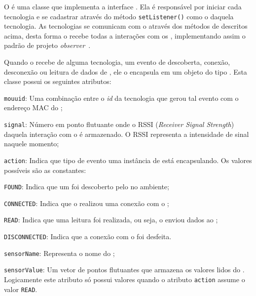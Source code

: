 O \stwopa é uma classe que implementa a interface \techlistener.
Ela é responsável por iniciar cada tecnologia e se cadastrar através do método \texttt{setListener()} como o \listener daquela tecnologia.
As tecnologias se comunicam com o \stwopa através dos métodos de \techlistener descritos acima, desta forma o \stwopa recebe todas a interações com os \smartobjs, implementando assim o padrão de projeto \textit{observer}~\cite{gamma:et-al:1994}.

Quando o \stwopa recebe de alguma tecnologia, um evento de descoberta, conexão, desconexão ou leitura de dados de \smartobjs, ele o encapsula em um objeto do tipo \sensordata.
Esta classe possui os seguintes atributos:

\begin{alineas}
	\item \texttt{mouuid}: Uma combinação entre o \textit{id} da tecnologia que gerou tal evento com o endereço MAC do \smartobj;

	\item \texttt{signal}: Número em ponto flutuante onde o RSSI (\textit{Receiver Signal Strength}) daquela interação com o \smartobj é armazenado. O RSSI representa a intensidade de sinal naquele momento;

	\item \texttt{action}: Indica que tipo de evento uma instância de \sensordata está encapsulando. Os valores possíveis são as constantes:

	\begin{alineas}

		\item \texttt{FOUND}: Indica que um \smartobj foi descoberto pelo \mhub no ambiente;

		\item \texttt{CONNECTED}: Indica que o \mhub realizou uma conexão com o \smartobj;

		\item \texttt{READ}: Indica que uma leitura foi realizada, ou seja, o \smartobj enviou dados ao \mhub;

		\item \texttt{DISCONNECTED}: Indica que a conexão com o \smartobj foi desfeita.

	\end{alineas}

	\item \texttt{sensorName}: Representa o nome do \smartobj;

	\item \texttt{sensorValue}: Um vetor de pontos flutuantes que armazena os valores lidos do \smartobj. Logicamente este atributo só possui valores quando o atributo \texttt{action} assume o valor \texttt{READ}.
\end{alineas}

